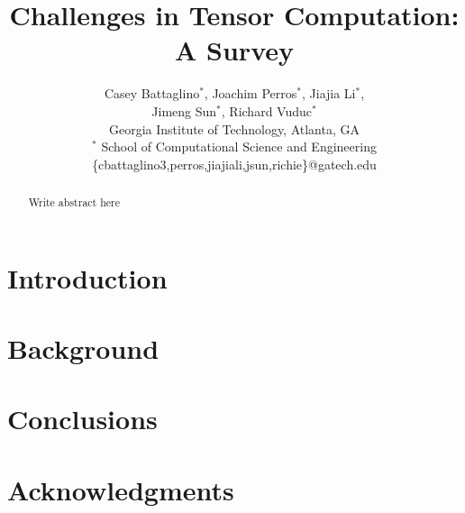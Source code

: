 \documentclass{acm_proc_article-sp}
\title{Challenges in Tensor Computation: A Survey}
\author{
  Casey Battaglino$^\ast$, Joachim Perros$^\ast$, Jiajia Li$^\ast$, \\
   Jimeng Sun$^\ast$, Richard Vuduc$^\ast$
  \\ Georgia Institute of Technology, Atlanta, GA
  \\ $^\ast$ School of Computational Science and Engineering \\
  \{cbattaglino3,perros,jiajiali,jsun,richie\}@gatech.edu } \date{}
\begin{document}

\maketitle

\begin{abstract}
  Write abstract here
\end{abstract}


\section{Introduction} \label{sec:intro}



\section{Background} \label{sec:background}



\section{Conclusions} \label{sec:conclusions}


\section{Acknowledgments} \label{sec:acknowledgments}

 



\end{document}

